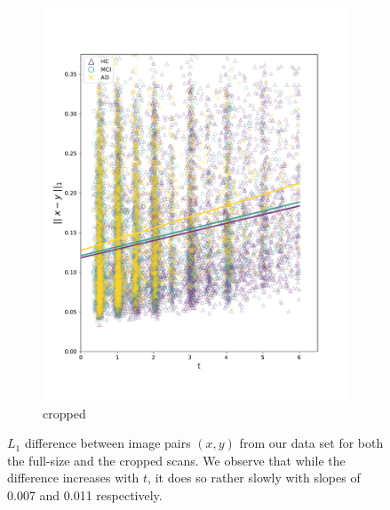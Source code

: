 \begin{figure}[h]
\begin{subfigure}{0.48\textwidth}
		\includegraphics[width=\linewidth, trim={10 30 30 30}, clip]{images/l1_diff_plots/slice.pdf}
		\caption{cropped}
	\end{subfigure}
	 
	\caption{$L_1$ difference between image pairs $(x, y)$ from our data set for both the full-size and the cropped scans. We observe that while the difference increases with $t$, it does so rather slowly with slopes of 0.007 and 0.011 respectively.}
	\label{fig:l1plots}
\end{figure}

